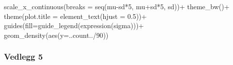 \documentclass[
]{book}
\newenvironment{Shaded}{\begin{snugshade}}{\end{snugshade}}
\newcommand{\AttributeTok}[1]{\textcolor[rgb]{0.77,0.63,0.00}{#1}}
\newcommand{\DecValTok}[1]{\textcolor[rgb]{0.00,0.00,0.81}{#1}}
\newcommand{\FloatTok}[1]{\textcolor[rgb]{0.00,0.00,0.81}{#1}}
\newcommand{\FunctionTok}[1]{\textcolor[rgb]{0.00,0.00,0.00}{#1}}
\newcommand{\NormalTok}[1]{#1}
\newcommand{\SpecialCharTok}[1]{\textcolor[rgb]{0.00,0.00,0.00}{#1}}
\begin{document}
\begin{Shaded}
\begin{Highlighting}[]
  \FunctionTok{scale\_x\_continuous}\NormalTok{(}\AttributeTok{breaks =} \FunctionTok{seq}\NormalTok{(mu}\SpecialCharTok{{-}}\NormalTok{sd}\SpecialCharTok{*}\DecValTok{5}\NormalTok{, mu}\SpecialCharTok{+}\NormalTok{sd}\SpecialCharTok{*}\DecValTok{5}\NormalTok{, sd))}\SpecialCharTok{+}
  \FunctionTok{theme\_bw}\NormalTok{()}\SpecialCharTok{+}
  \FunctionTok{theme}\NormalTok{(}\AttributeTok{plot.title =} \FunctionTok{element\_text}\NormalTok{(}\AttributeTok{hjust =} \FloatTok{0.5}\NormalTok{))}\SpecialCharTok{+}
  \FunctionTok{guides}\NormalTok{(}\AttributeTok{fill=}\FunctionTok{guide\_legend}\NormalTok{(}\FunctionTok{expression}\NormalTok{(sigma)))}\SpecialCharTok{+}
  \FunctionTok{geom\_density}\NormalTok{(}\FunctionTok{aes}\NormalTok{(}\AttributeTok{y=}\NormalTok{..count..}\SpecialCharTok{/}\DecValTok{90}\NormalTok{))}
\end{Highlighting}
\end{Shaded}

\hypertarget{vedlegg-5}{%
\subsubsection*{Vedlegg 5}\label{vedlegg-5}}
\end{document}
